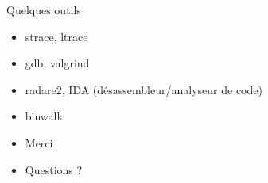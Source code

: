\documentclass{beamer}
\begin{document}
\begin{frame}{Quelques outils}
	\begin{itemize}
		\item strace, ltrace
		\item gdb, valgrind
		\item radare2, IDA (désassembleur/analyseur de code)
		\item binwalk
	\end{itemize}
\end{frame}


\begin{frame} 
	\begin{itemize}
    	\item Merci
		\item Questions ?
	\end{itemize}
\end{frame}
\end{document}
